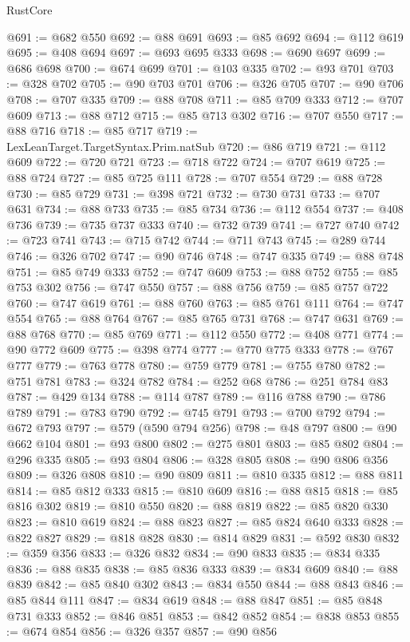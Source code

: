 \begin{lexlean}{RustCore}
\begin{coremodule}
@691 := @682 @550
@692 := @88 @691
@693 := @85 @692
@694 := @112 @619
@695 := @408 @694
@697 := @693 @695 @333
@698 := @690 @697
@699 := @686 @698
@700 := @674 @699
@701 := @103 @335
@702 := @93 @701
@703 := @328 @702
@705 := @90 @703 @701
@706 := @326 @705
@707 := @90 @706
@708 := @707 @335
@709 := @88 @708
@711 := @85 @709 @333
@712 := @707 @609
@713 := @88 @712
@715 := @85 @713 @302
@716 := @707 @550
@717 := @88 @716
@718 := @85 @717
@719 := LexLeanTarget.TargetSyntax.Prim.natSub
@720 := @86 @719
@721 := @112 @609
@722 := @720 @721
@723 := @718 @722
@724 := @707 @619
@725 := @88 @724
@727 := @85 @725 @111
@728 := @707 @554
@729 := @88 @728
@730 := @85 @729
@731 := @398 @721
@732 := @730 @731
@733 := @707 @631
@734 := @88 @733
@735 := @85 @734
@736 := @112 @554
@737 := @408 @736
@739 := @735 @737 @333
@740 := @732 @739
@741 := @727 @740
@742 := @723 @741
@743 := @715 @742
@744 := @711 @743
@745 := @289 @744
@746 := @326 @702
@747 := @90 @746
@748 := @747 @335
@749 := @88 @748
@751 := @85 @749 @333
@752 := @747 @609
@753 := @88 @752
@755 := @85 @753 @302
@756 := @747 @550
@757 := @88 @756
@759 := @85 @757 @722
@760 := @747 @619
@761 := @88 @760
@763 := @85 @761 @111
@764 := @747 @554
@765 := @88 @764
@767 := @85 @765 @731
@768 := @747 @631
@769 := @88 @768
@770 := @85 @769
@771 := @112 @550
@772 := @408 @771
@774 := @90 @772 @609
@775 := @398 @774
@777 := @770 @775 @333
@778 := @767 @777
@779 := @763 @778
@780 := @759 @779
@781 := @755 @780
@782 := @751 @781
@783 := @324 @782
@784 := @252 @68
@786 := @251 @784 @83
@787 := @429 @134
@788 := @114 @787
@789 := @116 @788
@790 := @786 @789
@791 := @783 @790
@792 := @745 @791
@793 := @700 @792
@794 := @672 @793
@797 := @579 (@590 @794 @256)
@798 := @48 @797
@800 := @90 @662 @104
@801 := @93 @800
@802 := @275 @801
@803 := @85 @802
@804 := @296 @335
@805 := @93 @804
@806 := @328 @805
@808 := @90 @806 @356
@809 := @326 @808
@810 := @90 @809
@811 := @810 @335
@812 := @88 @811
@814 := @85 @812 @333
@815 := @810 @609
@816 := @88 @815
@818 := @85 @816 @302
@819 := @810 @550
@820 := @88 @819
@822 := @85 @820 @330
@823 := @810 @619
@824 := @88 @823
@827 := @85 @824 @640 @333
@828 := @822 @827
@829 := @818 @828
@830 := @814 @829
@831 := @592 @830
@832 := @359 @356
@833 := @326 @832
@834 := @90 @833
@835 := @834 @335
@836 := @88 @835
@838 := @85 @836 @333
@839 := @834 @609
@840 := @88 @839
@842 := @85 @840 @302
@843 := @834 @550
@844 := @88 @843
@846 := @85 @844 @111
@847 := @834 @619
@848 := @88 @847
@851 := @85 @848 @731 @333
@852 := @846 @851
@853 := @842 @852
@854 := @838 @853
@855 := @674 @854
@856 := @326 @357
@857 := @90 @856

\end{coremodule}
\end{lexlean}
